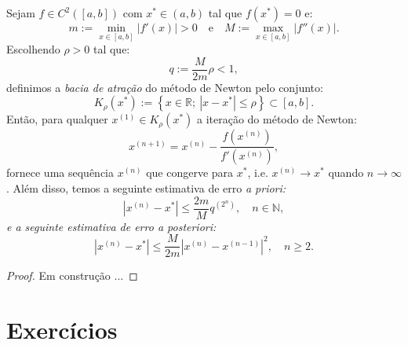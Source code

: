 \begin{teo}
  Sejam $f\in C^2([a, b])$ com $x^*\in (a, b)$ tal que $f(x^*) = 0$ e:
  \begin{equation*}
    m := \min_{x\in [a, b]}|f'(x)| > 0\quad\text{e}\quad M := \max_{x\in [a, b]} |f''(x)|.
  \end{equation*}
Escolhendo $\rho > 0$ tal que:
\begin{equation*}
  q := \frac{M}{2m}\rho < 1, 
\end{equation*}
definimos a \emph{bacia de atração} do método de Newton pelo conjunto:
\begin{equation*}
  K_\rho(x^*) := \left\{x\in\mathbb{R};~|x-x^*| \leq \rho\right\}\subset [a, b].
\end{equation*}
Então, para qualquer $x^{(1)}\in K_\rho(x^*)$ a iteração do método de Newton:
\begin{equation*}
  x^{(n+1)} = x^{(n)} - \frac{f(x^{(n)})}{f'(x^{(n)})},
\end{equation*}
fornece uma sequência $x^{(n)}$ que congerve para $x^*$, i.e. $x^{(n)}\to x^*$ quando $n\to \infty$. Além disso, temos a seguinte estimativa de erro \it{a priori}:
\begin{equation*}
  |x^{(n)} - x^*| \leq \frac{2m}{M}q^{(2^n)},\quad n\in\mathbb{N},
\end{equation*}
e a seguinte estimativa de erro \it{a posteriori}:
\begin{equation*}
  |x^{(n)} - x^*| \leq \frac{M}{2m}|x^{(n)} - x^{(n-1)}|^2,\quad n\geq 2.
\end{equation*}
\end{teo}
\begin{proof}
  Em construção ...
\end{proof}

\section*{Exercícios}

